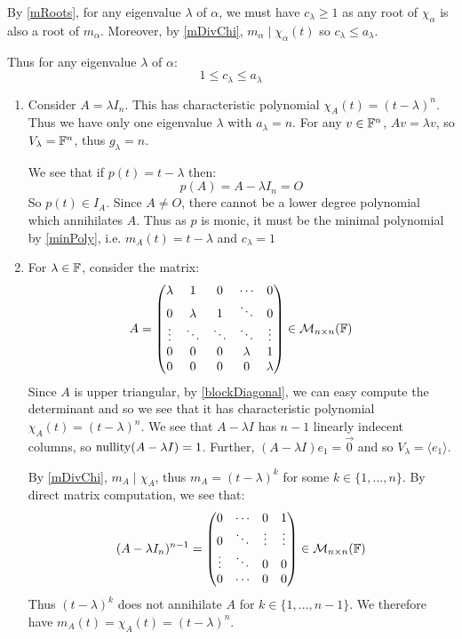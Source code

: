 \documentclass[../main.tex]{subfiles}
\begin{document}
\begin{remark}
  By \cref{mRoots}, for any eigenvalue $\lambda$ of $\alpha$, we must have $c_{\lambda} \geq 1$ as any root of $\chi_{\alpha}$ is also a root of $m_{\alpha}$.
  Moreover, by \cref{mDivChi}, $m_{\alpha} \mid \chi_{\alpha}(t)$ so $c_{\lambda} \leq a_{\lambda}$.

  Thus for any eigenvalue $\lambda$ of $\alpha$:
  \[
    1 \leq c_{\lambda} \leq a_{\lambda}
  \]
\end{remark}
\begin{example} \label{JBExample}
  \begin{enumerate}
    \item Consider $A = \lambda I_n$.
      This has characteristic polynomial $\chi_{A}(t) = (t - \lambda)^{n}$.
      Thus we have only one eigenvalue $\lambda$ with $a_{\lambda} = n$.
      For any $v \in \mathbb{F}^{n}$, $Av = \lambda v$, so $V_{\lambda} = \mathbb{F}^{n}$, thus $g_{\lambda} = n$.

      We see that if $p(t) = t - \lambda$ then:
      \[
        p(A) = A - \lambda I_n = O
      \]
      So $p(t) \in I_A$.
      Since $A \neq O$, there cannot be a lower degree polynomial which annihilates $A$.
      Thus as $p$ is monic, it must be the minimal polynomial by \cref{minPoly}, i.e. $m_{A}(t) = t - \lambda$ and $c_{\lambda} = 1$
    \item For $\lambda \in \mathbb{F}$, consider the matrix:
      \[
        A = \begin{pmatrix}
        \lambda & 1 & 0 & \cdots & 0 \\
        0 & \lambda & 1 & \ddots & 0 \\
        \vdots & \ddots & \ddots & \ddots & \vdots \\
        0 & 0 & 0 & \lambda & 1 \\
        0 & 0 & 0 & 0 & \lambda \\
        \end{pmatrix} \in \mathcal{M}_{n \times n}(\mathbb{F})
      \]
      Since $A$ is upper triangular, by \cref{blockDiagonal}, we can easy compute the determinant and so we see that it has characteristic polynomial $\chi_{A}(t) = (t - \lambda)^{n}$.
      We see that $A - \lambda I$ has $n - 1$ linearly indecent columns, so $\operatorname{nullity}(A - \lambda I) = 1$.
      Further, $(A - \lambda I)e_1 = \vec{0}$ and so $V_{\lambda} = \langle e_1 \rangle$.

      By \cref{mDivChi}, $m_{A} \mid \chi_{A}$, thus $m_{A} = (t - \lambda)^{k}$ for some $k \in \{1, \ldots, n\}$.
      By direct matrix computation, we see that:
      \[
        (A - \lambda I_n)^{n - 1} = \begin{pmatrix}
        0 & \cdots & 0 & 1 \\
        0 & \ddots & \vdots & \vdots \\
        \vdots & \ddots & 0 & 0 \\
        0 & \cdots & 0 & 0 \\
        \end{pmatrix} \in \mathcal{M}_{n \times n}(\mathbb{F})
      \]
      Thus $(t - \lambda)^{k}$ does not annihilate $A$ for $k \in \{1, \ldots, n - 1\}$.
      We therefore have $m_{A}(t) = \chi_{A}(t) = (t - \lambda)^{n}$.


\end{enumerate}
\end{example}
\end{document}
